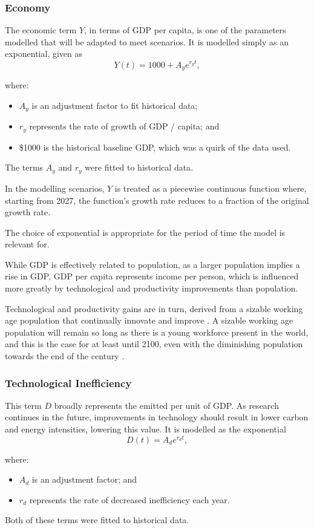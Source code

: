 \documentclass[12pt]{article}
\newcommand{\cotwo}{\text{CO\textsubscript{2}}}
\newcommand{\wherevars}[1]{
where:
\vspace{-1ex}
\begingroup
\renewcommand{\labelitemi}{-}
\begin{itemize}
    \setlength\itemsep{-0.2ex}
	#1
\end{itemize}
\endgroup
}
\begin{document}
\subsubsection{Economy}
The economic term $Y$, in terms of GDP per capita, is one of the parameters modelled that will be adapted to meet scenarios.
It is modelled simply as an exponential, given as
\begin{equation}	\label{eq:gdppc}
	Y(t) = 1000 + A_y e^{r_y t},
\end{equation}
\wherevars{
	\item $A_y$ is an adjustment factor to fit historical data;
	\item $r_y$ represents the rate of growth of GDP / capita; and
	\item \$1000 is the historical baseline GDP, which was a quirk of the data used\supercite{owid_gdppc}.
}
The terms $A_y$ and $r_y$ were fitted to historical data\supercite{our_code}.

In the modelling scenarios, $Y$ is treated as a piecewise continuous function where,
starting from 2027, the function's growth rate reduces to a fraction of the original growth rate.

The choice of exponential is appropriate for the period of time the model is relevant for.

While GDP is effectively related to population, as a larger population implies a rise in GDP,
GDP per capita represents income per person,
which is influenced more greatly by technological and productivity improvements than population.

Technological and productivity gains are in turn, derived from a sizable working age population that continually innovate and improve \cite{lindh_1999}.
A sizable working age population will remain so long as there is a young workforce present in the world,
and this is the case for at least until 2100, even with the diminishing population towards the end of the century \cite{un_population_2024}.


\subsubsection{Technological Inefficiency}
This term $D$ broadly represents the emitted \cotwo{} per unit of GDP.
As research continues in the future, improvements in technology should result in lower carbon and energy intensities, lowering this value.
It is modelled as the exponential
\begin{equation}	\label{eq:technological_inefficiency}
	D(t) = A_d e^{r_d t},
\end{equation}
\wherevars{
	\item $A_d$ is an adjustment factor; and
	\item $r_d$ represents the rate of decreased inefficiency each year.
}
Both of these terms were fitted to historical data\supercite{our_code}.
\end{document}
